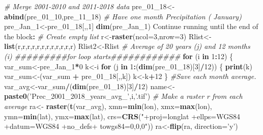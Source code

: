 \documentclass[
  10pt,
  b5paper,
]{book}
\newenvironment{Shaded}{\begin{snugshade}}{\end{snugshade}}
\newcommand{\CommentTok}[1]{\textcolor[rgb]{0.56,0.35,0.01}{\textit{#1}}}
\newcommand{\ControlFlowTok}[1]{\textcolor[rgb]{0.13,0.29,0.53}{\textbf{#1}}}
\newcommand{\DataTypeTok}[1]{\textcolor[rgb]{0.13,0.29,0.53}{#1}}
\newcommand{\DecValTok}[1]{\textcolor[rgb]{0.00,0.00,0.81}{#1}}
\newcommand{\KeywordTok}[1]{\textcolor[rgb]{0.13,0.29,0.53}{\textbf{#1}}}
\newcommand{\NormalTok}[1]{#1}
\newcommand{\OperatorTok}[1]{\textcolor[rgb]{0.81,0.36,0.00}{\textbf{#1}}}
\newcommand{\StringTok}[1]{\textcolor[rgb]{0.31,0.60,0.02}{#1}}
\begin{document}
\begin{Shaded}
\begin{Highlighting}[]
 \CommentTok{# Merge 2001-2010 and 2011-2018 data }
\NormalTok{ pre_}\DecValTok{01}\NormalTok{_}\DecValTok{18}\NormalTok{<-}\KeywordTok{abind}\NormalTok{(pre_}\DecValTok{01}\NormalTok{_}\DecValTok{10}\NormalTok{,pre_}\DecValTok{11}\NormalTok{_}\DecValTok{18}\NormalTok{)}
\CommentTok{# Have one month Precipitation ( January)}
\NormalTok{ pre_Jan_}\DecValTok{1}\NormalTok{<-pre_}\DecValTok{01}\NormalTok{_}\DecValTok{18}\NormalTok{[,,}\DecValTok{1}\NormalTok{]}
 \KeywordTok{dim}\NormalTok{(pre_Jan_}\DecValTok{1}\NormalTok{)  }
\NormalTok{ Continue running until the end of the block}\OperatorTok{:}
\StringTok{ }\CommentTok{# Create empty list}
\NormalTok{r<-}\KeywordTok{raster}\NormalTok{(}\DataTypeTok{ncol=}\DecValTok{3}\NormalTok{,}\DataTypeTok{nrow=}\DecValTok{3}\NormalTok{)}
\NormalTok{Rlist<-}\KeywordTok{list}\NormalTok{(r,r,r,r,r,r,r,r,r,r,r,r)}
\NormalTok{Rlist2<-Rlist}
 \CommentTok{# Average of 20 years (j)  and 12 months (i) }
\CommentTok{#########for loop starts############}
 \ControlFlowTok{for}\NormalTok{ (i }\ControlFlowTok{in} \DecValTok{1}\OperatorTok{:}\DecValTok{12}\NormalTok{) \{ }
\NormalTok{var_sum<-pre_Jan_}\DecValTok{1}\OperatorTok{*}\DecValTok{0}
\NormalTok{k<-i}
 \ControlFlowTok{for}\NormalTok{ (j }\ControlFlowTok{in} \DecValTok{1}\OperatorTok{:}\NormalTok{(}\KeywordTok{dim}\NormalTok{(pre_}\DecValTok{01}\NormalTok{_}\DecValTok{18}\NormalTok{)[}\DecValTok{3}\NormalTok{]}\OperatorTok{/}\DecValTok{12}\NormalTok{)) \{}
\KeywordTok{print}\NormalTok{(k)}
\NormalTok{var_sum<-(var_sum }\OperatorTok{+}\StringTok{ }\NormalTok{pre_}\DecValTok{01}\NormalTok{_}\DecValTok{18}\NormalTok{[,,k])}
\NormalTok{ k<-k}\OperatorTok{+}\DecValTok{12}
\NormalTok{ \}}
\CommentTok{#Save each month average. }
\NormalTok{ var_avg<-var_sum}\OperatorTok{/}\NormalTok{(}\KeywordTok{dim}\NormalTok{(pre_}\DecValTok{01}\NormalTok{_}\DecValTok{18}\NormalTok{)[}\DecValTok{3}\NormalTok{]}\OperatorTok{/}\DecValTok{12}\NormalTok{)}
\NormalTok{ name<-}\KeywordTok{paste0}\NormalTok{(}\StringTok{'Prec_2001_2018_years_avg_'}\NormalTok{,i,}\StringTok{'.tif'}\NormalTok{)}
 \CommentTok{# Make a raster r from  each average}
\NormalTok{ra<-}\StringTok{ }\KeywordTok{raster}\NormalTok{(}\KeywordTok{t}\NormalTok{(var_avg), }\DataTypeTok{xmn=}\KeywordTok{min}\NormalTok{(lon), }\DataTypeTok{xmx=}\KeywordTok{max}\NormalTok{(lon), }\DataTypeTok{ymn=}\KeywordTok{min}\NormalTok{(lat), }\DataTypeTok{ymx=}\KeywordTok{max}\NormalTok{(lat), }\DataTypeTok{crs=}\KeywordTok{CRS}\NormalTok{(}\StringTok{"+proj=longlat +ellps=WGS84 +datum=WGS84 +no_defs+ towgs84=0,0,0"}\NormalTok{))}
\NormalTok{ra<-}\KeywordTok{flip}\NormalTok{(ra, }\DataTypeTok{direction=}\StringTok{'y'}\NormalTok{)}

\end{Highlighting}
\end{Shaded}
\end{document}
